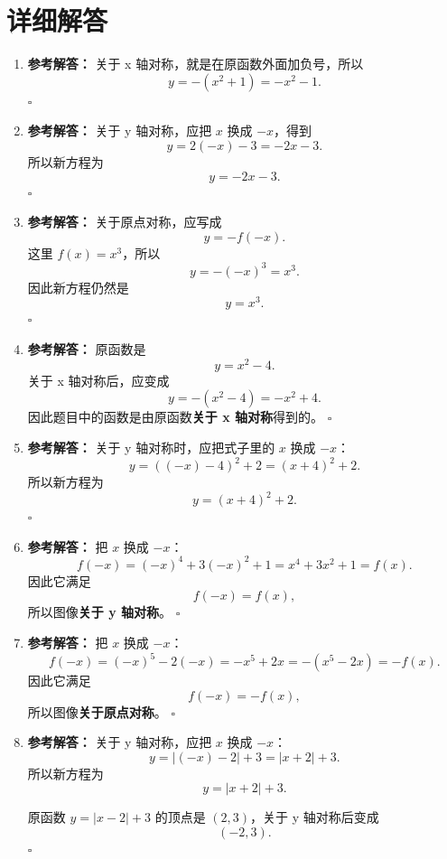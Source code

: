 \documentclass[11pt,a4paper,fontset=fandol]{ctexart}
\newenvironment{solution}{\par\noindent\textbf{参考解答：}}{\hfill$\square$\par}
\begin{document}
\newpage
\section{详细解答}

\begin{enumerate}
  \item \begin{solution}
  关于 x 轴对称，就是在原函数外面加负号，所以
  \[
  \boxed{y=-(x^2+1)=-x^2-1}.
  \]
  \end{solution}

  \item \begin{solution}
  关于 y 轴对称，应把 $x$ 换成 $-x$，得到
  \[
  y=2(-x)-3=-2x-3.
  \]
  所以新方程为
  \[
  \boxed{y=-2x-3}.
  \]
  \end{solution}

  \item \begin{solution}
  关于原点对称，应写成
  \[
  y=-f(-x).
  \]
  这里 $f(x)=x^3$，所以
  \[
  y=-(-x)^3=x^3.
  \]
  因此新方程仍然是
  \[
  \boxed{y=x^3}.
  \]
  \end{solution}

  \item \begin{solution}
  原函数是
  \[
  y=x^2-4.
  \]
  关于 x 轴对称后，应变成
  \[
  y=-(x^2-4)=-x^2+4.
  \]
  因此题目中的函数是由原函数\textbf{关于 x 轴对称}得到的。
  \end{solution}

  \item \begin{solution}
  关于 y 轴对称时，应把式子里的 $x$ 换成 $-x$：
  \[
  y=((-x)-4)^2+2=(x+4)^2+2.
  \]
  所以新方程为
  \[
  \boxed{y=(x+4)^2+2}.
  \]
  \end{solution}

  \item \begin{solution}
  把 $x$ 换成 $-x$：
  \[
  f(-x)=(-x)^4+3(-x)^2+1=x^4+3x^2+1=f(x).
  \]
  因此它满足
  \[
  f(-x)=f(x),
  \]
  所以图像\textbf{关于 y 轴对称}。
  \end{solution}

  \item \begin{solution}
  把 $x$ 换成 $-x$：
  \[
  f(-x)=(-x)^5-2(-x)=-x^5+2x=-(x^5-2x)=-f(x).
  \]
  因此它满足
  \[
  f(-x)=-f(x),
  \]
  所以图像\textbf{关于原点对称}。
  \end{solution}

  \item \begin{solution}
  关于 y 轴对称，应把 $x$ 换成 $-x$：
  \[
  y=|(-x)-2|+3=|x+2|+3.
  \]
  所以新方程为
  \[
  \boxed{y=|x+2|+3}.
  \]

  原函数 $y=|x-2|+3$ 的顶点是 $(2,3)$，关于 y 轴对称后变成
  \[
  \boxed{(-2,3)}.
  \]
  \end{solution}
\end{enumerate}
\end{document}
